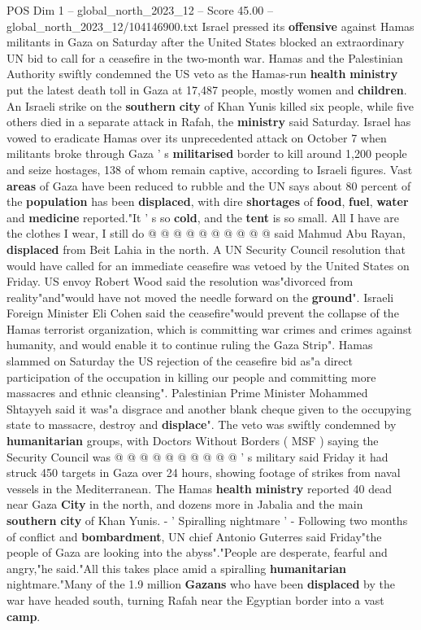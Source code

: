 \begin{textsample}{POS Dim 1 – global\_north\_2023\_12 – Score 45.00 – global\_north\_2023\_12/104146900.txt}  \label{ex:f1_pos_085}
Israel pressed its \textbf{offensive} against Hamas militants in Gaza on Saturday after the United States blocked an extraordinary UN bid to call for a ceasefire in the two-month war.
Hamas and the Palestinian Authority swiftly condemned the US veto as the Hamas-run \textbf{health} \textbf{ministry} put the latest death toll in Gaza at 17,487 people, mostly women and \textbf{children}.
An Israeli strike on the \textbf{southern} \textbf{city} of Khan Yunis killed six people, while five others died in a separate attack in Rafah, the \textbf{ministry} said Saturday.
Israel has vowed to eradicate Hamas over its unprecedented attack on October 7 when militants broke through Gaza ' s \textbf{militarised} border to kill around 1,200 people and seize hostages, 138 of whom remain captive, according to Israeli figures.
Vast \textbf{areas} of Gaza have been reduced to rubble and the UN says about 80 percent of the \textbf{population} has been \textbf{displaced}, with dire \textbf{shortages} of \textbf{food}, \textbf{fuel}, \textbf{water} and \textbf{medicine} reported."It ' s so \textbf{cold}, and the \textbf{tent} is so small.
All I have are the clothes I wear, I still do @ @ @ @ @ @ @ @ @ @ said Mahmud Abu Rayan, \textbf{displaced} from Beit Lahia in the north.
A UN Security Council resolution that would have called for an immediate ceasefire was vetoed by the United States on Friday.
US envoy Robert Wood said the resolution was"divorced from reality"and"would have not moved the needle forward on the \textbf{ground}".
Israeli Foreign Minister Eli Cohen said the ceasefire"would prevent the collapse of the Hamas terrorist organization, which is committing war crimes and crimes against humanity, and would enable it to continue ruling the Gaza Strip".
Hamas slammed on Saturday the US rejection of the ceasefire bid as"a direct participation of the occupation in killing our people and committing more massacres and ethnic cleansing".
Palestinian Prime Minister Mohammed Shtayyeh said it was"a disgrace and another blank cheque given to the occupying state to massacre, destroy and \textbf{displace}".
The veto was swiftly condemned by \textbf{humanitarian} groups, with Doctors Without Borders ( MSF ) saying the Security Council was @ @ @ @ @ @ @ @ @ @ ' s military said Friday it had struck 450 targets in Gaza over 24 hours, showing footage of strikes from naval vessels in the Mediterranean.
The Hamas \textbf{health} \textbf{ministry} reported 40 dead near Gaza \textbf{City} in the north, and dozens more in Jabalia and the main \textbf{southern} \textbf{city} of Khan Yunis. - ' Spiralling nightmare ' - Following two months of conflict and \textbf{bombardment}, UN chief Antonio Guterres said Friday"the people of Gaza are looking into the abyss"."People are desperate, fearful and angry,"he said."All this takes place amid a spiralling \textbf{humanitarian} nightmare."Many of the 1.9 million \textbf{Gazans} who have been \textbf{displaced} by the war have headed south, turning Rafah near the Egyptian border into a vast \textbf{camp}.

\end{textsample}
